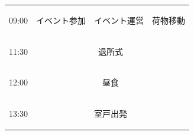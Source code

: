 \begin{longtable}[c]{|p{}|p{}|p{}|p{}|p{}|}
  \begin{tpacol}
    09:00
  \end{tpacol}&
  \begin{tpbcol}
    イベント参加
  \end{tpbcol}&
  \begin{tpccol}
    イベント運営
  \end{tpccol}&
  \multicolumn{2}{c|}{荷物移動}\\
  \hdashline


  \begin{tpacol}
    11:30
  \end{tpacol}&
  \multicolumn{4}{c|}{退所式} \\
  \hdashline

  \begin{tpacol}
    12:00
  \end{tpacol}&
  \multicolumn{4}{c|}{昼食} \\
  \hdashline

  \begin{tpacol}
    13:30
  \end{tpacol}&
  \multicolumn{4}{c|}{室戸出発} \\



\end{longtable}
